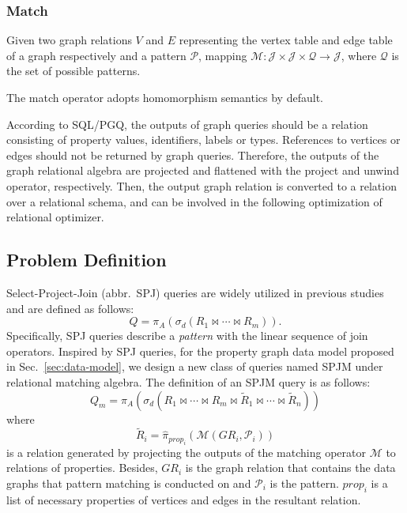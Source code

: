 \subsubsection{Match}

Given two graph relations $V$ and $E$ representing the vertex table and edge table of a graph respectively and a pattern $\mathcal{P}$, mapping $\mathcal{M}: \mathcal{J} \times \mathcal{J} \times \mathcal{Q} \rightarrow \mathcal{J}$, where $\mathcal{Q}$ is the set of possible patterns.

The match operator adopts homomorphism semantics by default.

According to SQL/PGQ, the outputs of graph queries should be a relation consisting of property values, identifiers, labels or types.
References to vertices or edges should not be returned by graph queries.
Therefore, the outputs of the graph relational algebra are projected and flattened with the project and unwind operator, respectively.
Then, the output graph relation is converted to a relation over a relational schema, and can be involved in the following optimization of relational optimizer.
\fi

\subsection{Problem Definition}
\label{sec:problem-definition}

Select-Project-Join (abbr.~SPJ) queries are widely utilized in previous studies \cite{spj} and are defined as follows:
\begin{equation*}
    Q = \pi_A(\sigma_d(R_1 \Join \cdots \Join R_m)).
\end{equation*}
Specifically, SPJ queries describe a \emph{pattern} with the linear sequence of join operators.
Inspired by SPJ queries, for the property graph data model proposed in Sec.~\ref{sec:data-model}, we design a new class of queries named SPJM under relational matching algebra.
The definition of an SPJM query is as follows:
\begin{equation*}
    Q_m = \pi_A(\sigma_d(R_1 \Join \cdots \Join R_m \Join \widetilde{R}_1 \Join \cdots \Join \widetilde{R}_n))
\end{equation*}
where
\begin{equation*}
    \tilde{R}_i = \hat{\pi}_{prop_i}(\mathcal{M}(GR_i, \mathcal{P}_i))
\end{equation*}
is a relation generated by projecting the outputs of the matching operator $\mathcal{M}$ to relations of properties.
Besides, $GR_i$ is the graph relation that contains the data graphs that pattern matching is conducted on and $\mathcal{P}_i$ is the pattern.
$prop_i$ is a list of necessary properties of vertices and edges in the resultant relation.


